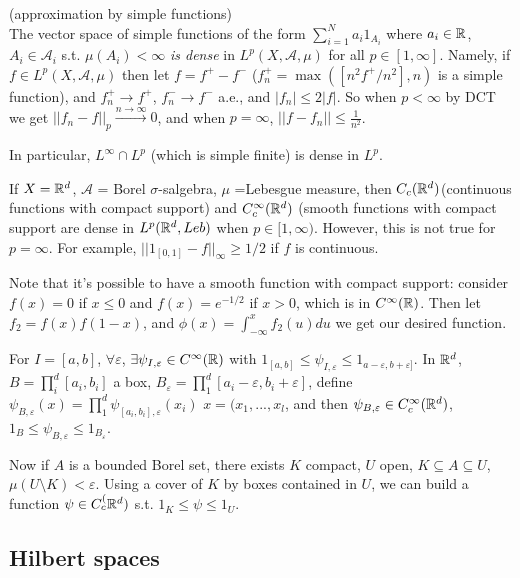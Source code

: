\documentclass[a4paper]{article}
\begin{document}
\begin{rem} (approximation by simple functions)\\
The vector space of simple functions of the form $\sum_{i=1}^N a_i 1_{A_i}$ where $a_i \in \mathbb{R}$, $A_i \in \mathcal{A}_i$ s.t. $\mu(A_i) < \infty$ \emph{is dense} in $L^p(X,\mathcal{A},\mu)$ for all $p \in [1,\infty]$. Namely, if $f \in L^p(X,\mathcal{A},\mu)$ then let $f = f^+ - f^-$ ($f^+_n = \max([n^2 f^+/n^2],n)$ is a simple function), and $f_n^+ \to f^+$, $f_n^- \to f^-$ a.e., and $|f_n| \leq 2|f|$. So when $p < \infty$ by DCT we get $||f_n-f||_p \xrightarrow{n \to \infty} 0$, and when $p=\infty$, $||f-f_n|| \leq \frac{1}{n^2}$.

In particular, $L^\infty \cap L^p$ (which is simple finite) is dense in $L^p$.
\end{rem}

\begin{rem}
If $X=\mathbb{R}^d$, $\mathcal{A}$ = Borel $\sigma$-salgebra, $\mu$ =Lebesgue measure, then $C_c(\mathbb{R}^d)$(continuous functions with compact support) and $C_c^\infty (\mathbb{R}^d)$ (smooth functions with compact support are dense in $L^p(\mathbb{R}^d, Leb)$ when $p \in [1,\infty)$. However, this is not true for $p=\infty$. For example, $||1_{[0,1]} - f||_\infty \geq 1/2$ if $f$ is continuous.

Note that it's possible to have a smooth function with compact support: consider $f(x) = 0$ if $x \leq 0$ and $f(x) = e^{-1/2}$ if $x>0$, which is in $C^\infty(\mathbb{R})$. Then let $f_2=f(x)f(1-x)$, and $\phi(x) = \int_{-\infty}^x f_2(u) du$ we get our desired function.

For $I = [a,b]$, $\forall \varepsilon$, $\exists \psi_{I,\varepsilon} \in C^\infty(\mathbb{R})$ with $1_{[a,b]} \leq \psi_{I,\varepsilon} \leq 1_{a-\varepsilon,b+\varepsilon]}$. In $\mathbb{R}^d$, $B=\prod_i^d [a_i,b_i]$ a box, $B_\varepsilon = \prod_1^d [a_i-\varepsilon,b_i+\varepsilon]$, define $\psi_{B,\varepsilon}(x) = \prod_1^d \psi_{[a_i,b_i],\varepsilon} (x_i)$ $x = (x_1,...,x_l$, and then $\psi_{B,\varepsilon} \in C_c^\infty (\mathbb{R}^d)$, $1_B \leq \psi_{B,\varepsilon} \leq 1_{B_\varepsilon}$.

Now if $A$ is a bounded Borel set, there exists $K$ compact, $U$ open, $K \subseteq A \subseteq U$, $\mu(U\setminus K)<\varepsilon$. Using a cover of $K$ by boxes contained in $U$, we can build a function $\psi \in C_c^(\mathbb{R}^d)$ s.t. $1_K \leq \psi \leq 1_U$.
\end{rem}

\subsection{Hilbert spaces}
\end{document}
